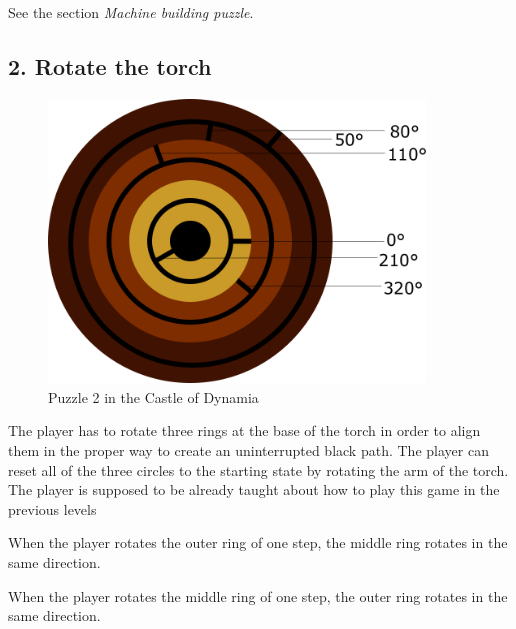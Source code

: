 %

%

See the section \textit{Machine building puzzle}.


\subsection{2. Rotate the torch}

\begin{figure}[H]
  \centering
  \includegraphics[width=10cm]{Images/Puzzles/castleOfDynamia2}
  \caption{Puzzle 2 in the Castle of Dynamia}
\end{figure}

The player has to rotate three rings at the base of the torch in order to align them in the proper way to create an uninterrupted black path. The player can reset all of the three circles to the starting state by rotating the arm of the torch. The player is supposed to be already taught about how to play this game in the previous levels

When the player rotates the outer ring of one step, the middle ring rotates in the same direction.

When the player rotates the middle ring of one step, the outer ring rotates in the same direction.

